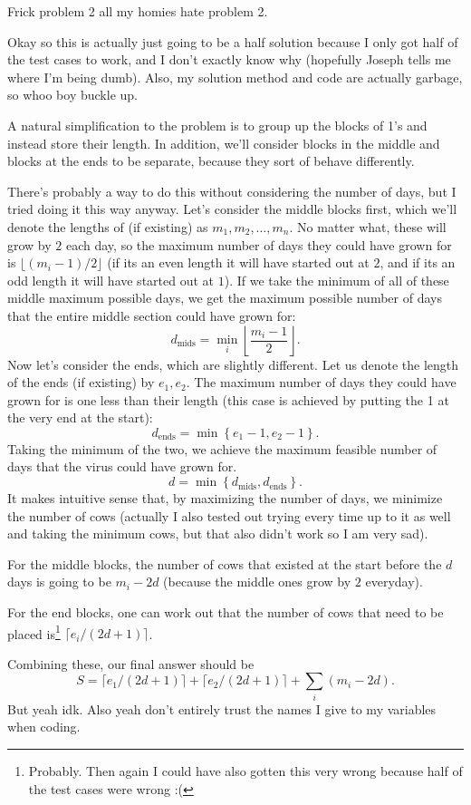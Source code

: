 \documentclass[12pt]{article}
\begin{document}
\begin{problemnum}
    Frick problem 2 all my homies hate problem 2.

    Okay so this is actually just going to be a half solution because I only got half of the test cases to work, and I don't exactly know why (hopefully Joseph tells me where I'm being dumb). Also, my solution method and code are actually garbage, so whoo boy buckle up.

    A natural simplification to the problem is to group up the blocks of 1's
    and instead store their length. In addition, we'll consider blocks in the
    middle and blocks at the ends to be separate, because they sort of behave
    differently.

    There's probably a way to do this without considering the number of days,
    but I tried doing it this way anyway. Let's consider the middle blocks
    first, which we'll denote the lengths of (if existing) as \( m_1, m_2,
    \ldots, m_n \). No matter what, these will grow by \( 2 \) each day, so the
    maximum number of days they could have grown for is \( \lfloor (m_i - 1) /
    2 \rfloor \) (if its an even length it will have started out at \( 2 \),
    and if its an odd length it will have started out at \( 1 \)). If we take
    the minimum of all of these middle maximum possible days, we get the
    maximum possible number of days that the entire middle section could have
    grown for:
    \[
        d_{\textrm{mids}} = \min_{i} \left\lfloor \frac{m_i - 1}{2} \right\rfloor
    .\]
    Now let's consider the ends, which are slightly different. Let us denote the length of the ends (if existing) by \( e_1, e_2 \). The maximum
    number of days they could have grown for is one less than their length
    (this case is achieved by putting the 1 at the very end at the start):
    \[
        d_{\textrm{ends}} = \min{\left\{ e_1 - 1, e_2 - 1 \right\}}
    .\]
    Taking the minimum of the two, we achieve the maximum feasible number of
    days that the virus could have grown for.
    \[
        d = \min{\left\{ d_{\textrm{mids}}, d_{\textrm{ends}} \right\}}
    .\]
    It makes intuitive sense that, by maximizing the number of days, we
    minimize the number of cows (actually I also tested out trying every time
    up to it as well and taking the minimum cows, but that also didn't work so
    I am very sad).

    For the middle blocks, the number of cows that existed at the start before the \( d \) days is going to be \( m_i - 2d \) (because the middle ones grow by \( 2 \) everyday).

    For the end blocks, one can work out that the number of cows that need to be placed is\footnote{Probably. Then again I could have also gotten this very wrong because half of the test cases were wrong :(} \( \lceil e_i/(2d+1) \rceil \).

    Combining these, our final answer should be
    \[
        S = \lceil e_1/(2d+1) \rceil + \lceil e_2/(2d+1) \rceil + \sum_{i} (m_i - 2d)
    .\]
    But yeah idk. Also yeah don't entirely trust the names I give to my variables when coding.

    
\end{problemnum}
\end{document}
